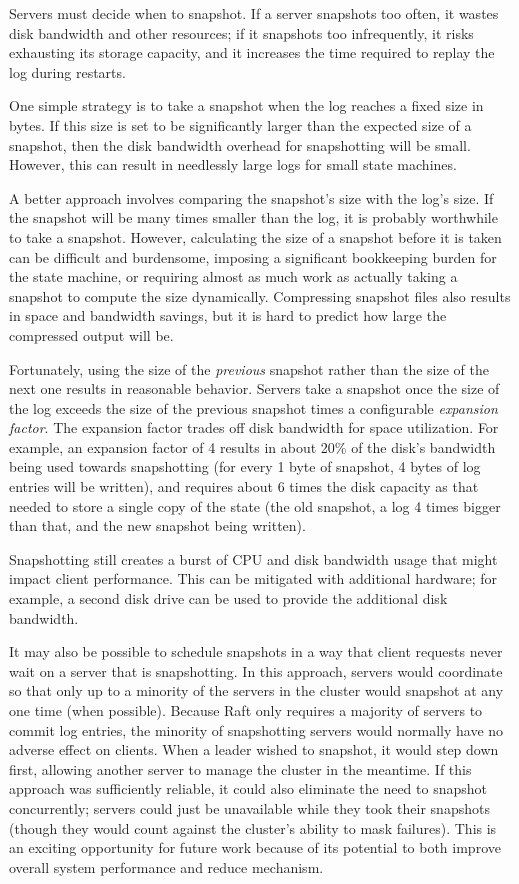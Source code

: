 Servers must decide when to snapshot. If a server snapshots too often,
it wastes disk bandwidth and other resources; if it snapshots too
infrequently, it risks exhausting its storage capacity, and it increases
the time required to replay the log during restarts.

One simple strategy is to take a snapshot when the log reaches a fixed
size in bytes. If this size is set to be significantly larger than the
expected size of a snapshot, then the disk bandwidth overhead for
snapshotting will be small. However, this can result in needlessly large
logs for small state machines.

A better approach involves comparing the snapshot's size with the log's
size. If the snapshot will be many times smaller than the log, it is
probably worthwhile to take a snapshot. However, calculating the size of
a snapshot before it is taken can be difficult and burdensome, imposing
a significant bookkeeping burden for the state machine, or requiring
almost as much work as actually taking a snapshot to compute the size
dynamically. Compressing snapshot files also results in space and
bandwidth savings, but it is hard to predict how large the compressed
output will be.

Fortunately, using the size of the \emph{previous} snapshot rather than
the size of the next one results in reasonable behavior. Servers take a
snapshot once the size of the log
exceeds the size of the previous snapshot times a configurable
\emph{expansion factor}. The expansion factor trades off disk bandwidth
for space utilization. For example, an expansion factor of 4 results in
about 20\% of the disk's bandwidth being used towards snapshotting (for
every 1 byte of snapshot, 4 bytes of log entries will be written), and
requires about 6 times the disk capacity as that needed to store a
single copy of the state (the old snapshot, a log 4 times bigger than
that, and the new snapshot being written).

Snapshotting still creates a burst of CPU and disk bandwidth usage that
might impact client performance. This can be mitigated with additional
hardware; for example, a second disk drive can be used to provide the
additional disk bandwidth.

It may also be possible to schedule snapshots in a way that client
requests never wait on a server that is snapshotting. In this approach,
servers would coordinate so that only up to a minority of the servers in
the cluster would snapshot at any one time (when possible). Because Raft
only requires a majority of servers to commit log entries, the minority of
snapshotting servers would normally have no adverse effect on clients.
When a leader wished to snapshot, it would step down first,
allowing another server to manage the cluster in the meantime. If this
approach was sufficiently reliable, it could also eliminate the need to
snapshot concurrently; servers could just be unavailable while they took
their snapshots (though they would count against the cluster's
ability to mask failures). This is an exciting opportunity for future
work because of its potential to both improve overall system performance
and reduce mechanism. 


